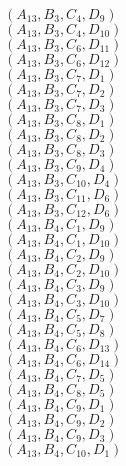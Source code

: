 \documentclass[14pt]{article}
\begin{document}
    $({A}_{13}, {B}_{3}, {C}_{4}, {D}_{9}) $ \\ 
    $({A}_{13}, {B}_{3}, {C}_{4}, {D}_{10}) $ \\ 
    $({A}_{13}, {B}_{3}, {C}_{6}, {D}_{11}) $ \\ 
    $({A}_{13}, {B}_{3}, {C}_{6}, {D}_{12}) $ \\ 
    $({A}_{13}, {B}_{3}, {C}_{7}, {D}_{1}) $ \\ 
    $({A}_{13}, {B}_{3}, {C}_{7}, {D}_{2}) $ \\ 
    $({A}_{13}, {B}_{3}, {C}_{7}, {D}_{3}) $ \\ 
    $({A}_{13}, {B}_{3}, {C}_{8}, {D}_{1}) $ \\ 
    $({A}_{13}, {B}_{3}, {C}_{8}, {D}_{2}) $ \\ 
    $({A}_{13}, {B}_{3}, {C}_{8}, {D}_{3}) $ \\ 
    $({A}_{13}, {B}_{3}, {C}_{9}, {D}_{4}) $ \\ 
    $({A}_{13}, {B}_{3}, {C}_{10}, {D}_{4}) $ \\ 
    $({A}_{13}, {B}_{3}, {C}_{11}, {D}_{6}) $ \\ 
    $({A}_{13}, {B}_{3}, {C}_{12}, {D}_{6}) $ \\ 
    $({A}_{13}, {B}_{4}, {C}_{1}, {D}_{9}) $ \\ 
    $({A}_{13}, {B}_{4}, {C}_{1}, {D}_{10}) $ \\ 
    $({A}_{13}, {B}_{4}, {C}_{2}, {D}_{9}) $ \\ 
    $({A}_{13}, {B}_{4}, {C}_{2}, {D}_{10}) $ \\ 
    $({A}_{13}, {B}_{4}, {C}_{3}, {D}_{9}) $ \\ 
    $({A}_{13}, {B}_{4}, {C}_{3}, {D}_{10}) $ \\ 
    $({A}_{13}, {B}_{4}, {C}_{5}, {D}_{7}) $ \\ 
    $({A}_{13}, {B}_{4}, {C}_{5}, {D}_{8}) $ \\ 
    $({A}_{13}, {B}_{4}, {C}_{6}, {D}_{13}) $ \\ 
    $({A}_{13}, {B}_{4}, {C}_{6}, {D}_{14}) $ \\ 
    $({A}_{13}, {B}_{4}, {C}_{7}, {D}_{5}) $ \\ 
    $({A}_{13}, {B}_{4}, {C}_{8}, {D}_{5}) $ \\ 
    $({A}_{13}, {B}_{4}, {C}_{9}, {D}_{1}) $ \\ 
    $({A}_{13}, {B}_{4}, {C}_{9}, {D}_{2}) $ \\ 
    $({A}_{13}, {B}_{4}, {C}_{9}, {D}_{3}) $ \\ 
    $({A}_{13}, {B}_{4}, {C}_{10}, {D}_{1}) $ \\ 
\end{document}
